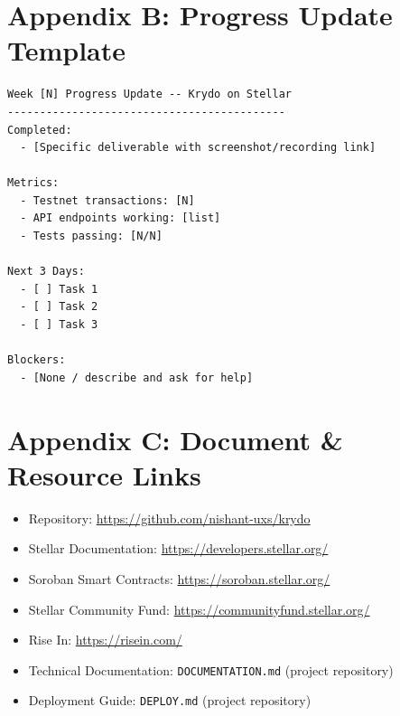 \documentclass[11pt,a4paper]{article}
\begin{document}
\section{Appendix B: Progress Update Template}

\begin{verbatim}
Week [N] Progress Update -- Krydo on Stellar
-------------------------------------------
Completed:
  - [Specific deliverable with screenshot/recording link]

Metrics:
  - Testnet transactions: [N]
  - API endpoints working: [list]
  - Tests passing: [N/N]

Next 3 Days:
  - [ ] Task 1
  - [ ] Task 2
  - [ ] Task 3

Blockers:
  - [None / describe and ask for help]
\end{verbatim}

\section{Appendix C: Document \& Resource Links}

\begin{itemize}
  \item Repository: \url{https://github.com/nishant-uxs/krydo}
  \item Stellar Documentation: \url{https://developers.stellar.org/}
  \item Soroban Smart Contracts: \url{https://soroban.stellar.org/}
  \item Stellar Community Fund: \url{https://communityfund.stellar.org/}
  \item Rise In: \url{https://risein.com/}
  \item Technical Documentation: \texttt{DOCUMENTATION.md} (project repository)
  \item Deployment Guide: \texttt{DEPLOY.md} (project repository)
\end{itemize}
\end{document}
